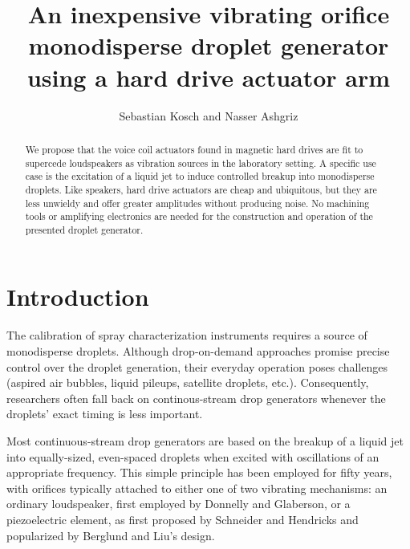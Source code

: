 \documentclass[aip,rsi,reprint,graphicx]{revtex4-1} %
\begin{document}
\title{An inexpensive vibrating orifice monodisperse droplet generator using a hard
drive actuator arm}
\author{Sebastian Kosch and Nasser Ashgriz}
\begin{abstract}
    We propose that the voice coil actuators found in magnetic hard drives are
    fit to supercede loudspeakers as vibration sources in the laboratory setting. A
    specific use case is the excitation of a liquid jet to induce controlled
    breakup into monodisperse droplets. Like speakers, hard drive actuators are cheap and
    ubiquitous, but they are less unwieldy and offer greater amplitudes without
    producing noise. No machining tools or amplifying electronics
    are needed for the construction and operation of the presented droplet generator.
\end{abstract}
\maketitle
\section{Introduction}
The calibration of spray characterization instruments requires a source of
monodisperse droplets. Although drop-on-demand approaches promise
precise control over the droplet generation, their everyday operation poses
challenges (aspired air bubbles, liquid pileups, satellite droplets, etc.).
Consequently, researchers often fall back on continous-stream drop generators
whenever the droplets' exact timing is less important.

Most continuous-stream drop generators are based on the breakup of a liquid jet
into equally-sized, even-spaced droplets when excited with oscillations of an
appropriate frequency. This simple principle has been employed for fifty
years, with orifices typically attached to either one of two vibrating mechanisms: an
ordinary loudspeaker, first employed by Donnelly and Glaberson\cite{Donnelly66}, or a piezoelectric element, as first proposed by Schneider
and Hendricks\cite{Schneider64} and popularized by Berglund and Liu's
design\cite{Berglund73}.
\end{document}
